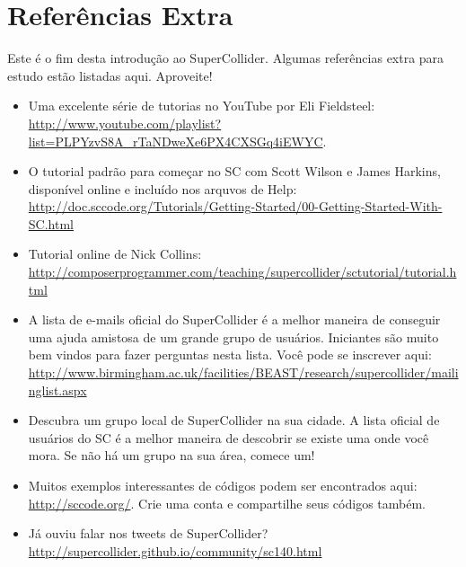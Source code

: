 \section{Referências Extra}

Este é o fim desta introdução ao SuperCollider. Algumas referências extra para estudo estão listadas aqui. Aproveite!

\begin{itemize}
\item Uma excelente série de tutorias no YouTube por Eli Fieldsteel: \url{http://www.youtube.com/playlist?list=PLPYzvS8A_rTaNDweXe6PX4CXSGq4iEWYC}. 

\item O tutorial padrão para começar no SC com Scott Wilson e James Harkins, disponível online e incluído nos arquvos de Help:  
\url{http://doc.sccode.org/Tutorials/Getting-Started/00-Getting-Started-With-SC.html}

\item Tutorial online de Nick Collins: \url{http://composerprogrammer.com/teaching/supercollider/sctutorial/tutorial.html}
 
\item A lista de e-mails oficial do SuperCollider é a melhor maneira de conseguir uma ajuda amistosa de um grande grupo de usuários. Iniciantes são muito bem vindos para fazer perguntas nesta lista. Você pode se inscrever aqui: \url{http://www.birmingham.ac.uk/facilities/BEAST/research/supercollider/mailinglist.aspx}

\item Descubra um grupo local de SuperCollider na sua cidade. A lista oficial de usuários do SC é a melhor maneira de descobrir se existe uma onde você mora. Se não há um grupo na sua área, comece um!

\item Muitos exemplos interessantes de códigos podem ser encontrados aqui: \url{http://sccode.org/}. Crie uma conta e compartilhe seus códigos também.

\item Já ouviu falar nos tweets de SuperCollider? \url{http://supercollider.github.io/community/sc140.html}

\end{itemize}
